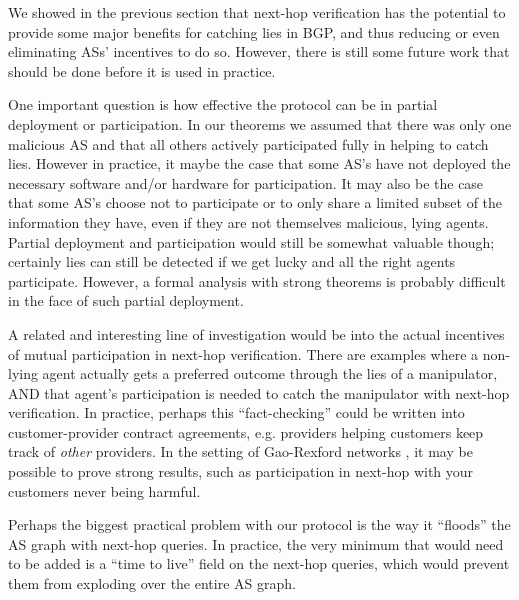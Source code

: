 \documentclass[10pt]{article}
\begin{document}
  We showed in the previous section that next-hop verification has the potential
  to provide some major benefits for catching lies in BGP, and thus reducing or
  even eliminating ASs' incentives to do so. However, there is still some future
  work that should be done before it is used in practice.

  One important question is how effective the protocol can be in partial
  deployment or participation. In our theorems we assumed that there was only
  one malicious AS and that all others actively participated fully in helping to
  catch lies. However in practice, it maybe the case that some AS's have not
  deployed the necessary software and/or hardware for participation. It may also
  be the case that some AS's choose not to participate or to only share a
  limited subset of the information they have, even if they are not themselves
  malicious, lying agents.
  Partial deployment and participation would still be somewhat valuable though;
  certainly lies can still be detected if we get lucky and all the right agents
  participate. However, a formal analysis with strong theorems is probably
  difficult in the face of such partial deployment.

  A related and interesting line of investigation would be into the
  actual incentives of mutual participation in next-hop verification.
  There are examples where a non-lying agent actually gets a preferred outcome
  through the lies of a manipulator, AND that agent's participation is needed to
  catch the manipulator with next-hop verification.
  In practice, perhaps this ``fact-checking'' could be written into
  customer-provider contract agreements,
  e.g. providers helping customers keep track of \emph{other} providers.
  In the setting of Gao-Rexford networks \cite{GaoRexford}, it may be possible
  to prove strong results, such as participation in next-hop with your customers
  never being harmful.

  Perhaps the biggest practical problem with our protocol
  is the way it ``floods'' the AS graph with next-hop queries.
  In practice, the very minimum that would need to be added is a
  ``time to live'' field on the next-hop queries,
  which would prevent them from exploding over the entire AS graph.
\end{document}
